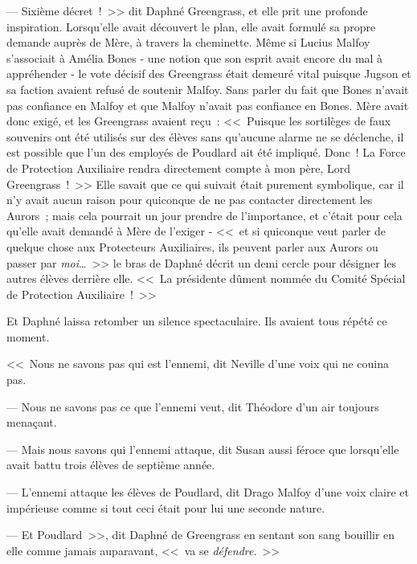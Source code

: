 --- Sixième décret~!~>> dit Daphné Greengrass, et elle prit une profonde inspiration. Lorsqu'elle avait découvert le plan, elle avait formulé sa propre demande auprès de Mère, à travers la cheminette. Même si Lucius Malfoy s'associait à Amélia Bones - une notion que son esprit avait encore du mal à appréhender - le vote décisif des Greengrass était demeuré vital puisque Jugson et sa faction avaient refusé de soutenir Malfoy. Sans parler du fait que Bones n'avait pas confiance en Malfoy et que Malfoy n'avait pas confiance en Bones. Mère avait donc exigé, et les Greengrass avaient reçu~: <<~Puisque les sortilèges de faux souvenirs ont été utilisés sur des élèves sans qu'aucune alarme ne se déclenche, il est possible que l'un des employés de Poudlard ait été impliqué. Donc~! La Force de Protection Auxiliaire rendra directement compte à mon père, Lord Greengrass~!~>> Elle savait que ce qui suivait était purement symbolique, car il n'y avait aucun raison pour quiconque de ne pas contacter directement les Aurors~; mais cela pourrait un jour prendre de l'importance, et c'était pour cela qu'elle avait demandé à Mère de l'exiger - <<~et si quiconque veut parler de quelque chose aux Protecteurs Auxiliaires, ils peuvent parler aux Aurors ou passer par \emph{moi}…~>> le bras de Daphné décrit un demi cercle pour désigner les autres élèves derrière elle. <<~La présidente dûment nommée du Comité Spécial de Protection Auxiliaire~!~>>

Et Daphné laissa retomber un silence spectaculaire. Ils avaient tous répété ce moment.

<<~Nous ne savons pas qui est l'ennemi, dit Neville d'une voix qui ne couina pas.

--- Nous ne savons pas ce que l'ennemi veut, dit Théodore d'un air toujours menaçant.

--- Mais nous savons qui l'ennemi attaque, dit Susan aussi féroce que lorsqu'elle avait battu trois élèves de septième année.

--- L'ennemi attaque les élèves de Poudlard, dit Drago Malfoy d'une voix claire et impérieuse comme si tout ceci était pour lui une seconde nature.

--- Et Poudlard~>>, dit Daphné de Greengrass en sentant son sang bouillir en elle comme jamais auparavant, <<~va se \emph{défendre}.~>>

